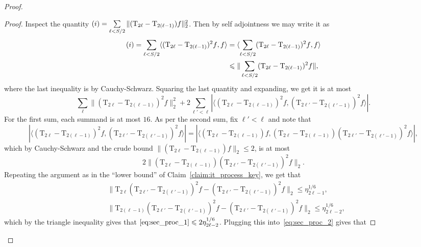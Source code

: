 \documentclass[11pt]{article}
\newcommand\card[1]{\left| {#1} \right|}
\newcommand\norm[1]{\| #1 \|}
\newcommand\inner[2]{\langle{#1},{#2}\rangle}
\renewcommand\leq{\leqslant}
\newcommand{\rom}[1]{\uppercase\expandafter{\romannumeral #1\relax}}
\begin{document}
\begin{proof}
\begin{proof}
        Inspect the quantity 
        $(\rom{1}) = \sum\limits_{\ell<S/2}\norm{(\mathrm{T}_{2\ell}-\mathrm{T}_{2(\ell-1)})f}_2^2$. Then by self adjointness we may write it as
        \begin{align*}
        (\rom{1})
        =
        \sum\limits_{\ell<S/2}\inner{(\mathrm{T}_{2\ell}-\mathrm{T}_{2(\ell-1)})^2f}{f}
        &=\inner{\sum\limits_{\ell<S/2}(\mathrm{T}_{2\ell}-\mathrm{T}_{2(\ell-1)})^2f}{f}\\
        &\leq \norm{\sum\limits_{\ell<S/2}(\mathrm{T}_{2\ell}-\mathrm{T}_{2(\ell-1)})^2f},
        \end{align*}
        where the last inequality is by Cauchy-Schwarz. Squaring the last quantity and expanding, we get it is at most
        \begin{equation}\label{eq:sec_proc_2}
        \sum\limits_{\ell}\norm{(\mathrm{T}_{2\ell}-\mathrm{T}_{2(\ell-1)})^2f}_2^2+2\sum\limits_{\ell'<\ell}\card{\inner{(\mathrm{T}_{2\ell}-\mathrm{T}_{2(\ell-1)})^2f}{(\mathrm{T}_{2\ell'}-\mathrm{T}_{2(\ell'-1)})^2f}}.
        \end{equation}
        For the first sum, each summand is at most $16$. As per the second sum, fix $\ell'<\ell$ and note that 
        \[
        \card{\inner{(\mathrm{T}_{2\ell}-\mathrm{T}_{2(\ell-1)})^2f}{(\mathrm{T}_{2\ell'}-\mathrm{T}_{2(\ell'-1)})^2f}}
        =\card{\inner{(\mathrm{T}_{2\ell}-\mathrm{T}_{2(\ell-1)})f}{(\mathrm{T}_{2\ell}-\mathrm{T}_{2(\ell-1)})(\mathrm{T}_{2\ell'}-\mathrm{T}_{2(\ell'-1)})^2f}},
        \]
        which by Cauchy-Schwarz and the crude bound $\norm{(\mathrm{T}_{2\ell}-\mathrm{T}_{2(\ell-1)})f}_2\leq 2$, is at most 
        \begin{equation}\label{eq:sec_proc_1}
        2\norm{(\mathrm{T}_{2\ell}-\mathrm{T}_{2(\ell-1)})(\mathrm{T}_{2\ell'}-\mathrm{T}_{2(\ell'-1)})^2f}_2.
        \end{equation}
        Repeating the argument as in the ``lower bound'' of Claim~\ref{claim:it_process_key}, we get that 
        \begin{align*}
        &\norm{\mathrm{T}_{2\ell}(\mathrm{T}_{2\ell'}-\mathrm{T}_{2(\ell'-1)})^2f-(\mathrm{T}_{2\ell'}-\mathrm{T}_{2(\ell'-1)})^2f}_2\leq \eta_{2\ell-1}^{1/6},\\
        &\norm{\mathrm{T}_{2(\ell-1)}(\mathrm{T}_{2\ell'}-\mathrm{T}_{2(\ell'-1)})^2f-(\mathrm{T}_{2\ell'}-\mathrm{T}_{2(\ell'-1)})^2f}_2\leq \eta_{2\ell-2}^{1/6},
        \end{align*}
        which by the triangle inequality gives that 
        $\eqref{eq:sec_proc_1}\leq 2\eta_{2\ell-2}^{1/6}$. Plugging this into~\eqref{eq:sec_proc_2} gives that 

\end{proof}
\end{proof}
\end{document}
